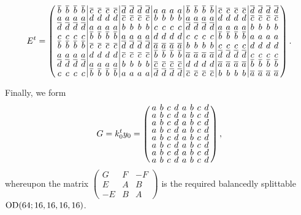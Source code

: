\documentclass[../../main]{subfiles}
\begin{document}
\[
  E^t = \left(
    \arraycolsep=2.0pt\def\arraystretch{0.5}
    \begin{array}{cccc|cccc|cccc|cccc|cccc|cccc|cccc}
      \bar{b}&\bar{b}&\bar{b}&\bar{b}&\bar{c}&\bar{c}&\bar{c}&\bar{c}&\bar{d}&\bar{d}&\bar{d}&\bar{d}&a&a&a&a&\bar{b}&\bar{b}&\bar{b}&\bar{b}&\bar{c}&\bar{c}&\bar{c}&\bar{c}&\bar{d}&\bar{d}&\bar{d}&\bar{d}\\
      a&a&a&a&d&d&d&d&\bar{c}&\bar{c}&\bar{c}&\bar{c}&b&b&b&b&a&a&a&a&d&d&d&d&\bar{c}&\bar{c}&\bar{c}&\bar{c}\\
      \bar{d}&\bar{d}&\bar{d}&\bar{d}&a&a&a&a&b&b&b&b&c&c&c&c&\bar{d}&\bar{d}&\bar{d}&\bar{d}&a&a&a&a&b&b&b&b\\
      c&c&c&c&\bar{b}&\bar{b}&\bar{b}&\bar{b}&a&a&a&a&d&d&d&d&c&c&c&c&\bar{b}&\bar{b}&\bar{b}&\bar{b}&a&a&a&a\\
      \bar{b}&\bar{b}&\bar{b}&\bar{b}&\bar{c}&\bar{c}&\bar{c}&\bar{c}&\bar{d}&\bar{d}&\bar{d}&\bar{d}&\bar{a}&\bar{a}&\bar{a}&\bar{a}&b&b&b&b&c&c&c&c&d&d&d&d\\
      a&a&a&a&d&d&d&d&\bar{c}&\bar{c}&\bar{c}&\bar{c}&\bar{b}&\bar{b}&\bar{b}&\bar{b}&\bar{a}&\bar{a}&\bar{a}&\bar{a}&\bar{d}&\bar{d}&\bar{d}&\bar{d}&c&c&c&c\\
      \bar{d}&\bar{d}&\bar{d}&\bar{d}&a&a&a&a&b&b&b&b&\bar{c}&\bar{c}&\bar{c}&\bar{c}&d&d&d&d&\bar{a}&\bar{a}&\bar{a}&\bar{a}&\bar{b}&\bar{b}&\bar{b}&\bar{b}\\
      c&c&c&c&\bar{b}&\bar{b}&\bar{b}&\bar{b}&a&a&a&a&\bar{d}&\bar{d}&\bar{d}&\bar{d}&\bar{c}&\bar{c}&\bar{c}&\bar{c}&b&b&b&b&\bar{a}&\bar{a}&\bar{a}&\bar{a}\\
    \end{array}
  \right).
\]

Finally, we form 
\[
  G = k_0^ty_0 
    = \left(
      \arraycolsep=2.0pt\def\arraystretch{0.5}
      \begin{array}{cccccccc}
        a&b&c&d&a&b&c&d\\
        a&b&c&d&a&b&c&d\\
        a&b&c&d&a&b&c&d\\
        a&b&c&d&a&b&c&d\\
        a&b&c&d&a&b&c&d\\
        a&b&c&d&a&b&c&d\\
        a&b&c&d&a&b&c&d\\
        a&b&c&d&a&b&c&d\\
      \end{array}
      \right),
\]
whereupon the matrix
$
\left(
  \begin{smallmatrix}
    G & F & -F \\
    E & A & B \\
    -E & B & A
  \end{smallmatrix}
\right)
$
is the required balancedly splittable $\text{OD}(64;16,16,16,16)$.
\end{document}
